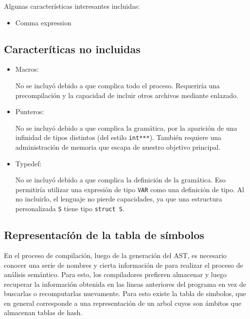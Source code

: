 \documentclass[12pt]{article}
\begin{document}
Algunas caracter\'isticas interesantes incluidas:
\begin{itemize}
    \item Comma expression
\end{itemize}

\subsection*{Caracter\'iticas no incluidas}
\begin{itemize}
    \item Macros:

    No se incluy\'o debido a que complica todo el proceso. Requerir\'ia una precompilaci\'on y la capacidad de incluir otros archivos mediante enlazado.
    \item Punteros:

    No se incluy\'o debido a que complica la gram\'atica, por la aparici\'on de una infinidad de tipos distintos (del estilo \texttt{int***}). Tambi\'en requiere una administraci\'on de memoria que escapa de nuestro objetivo principal.

    \item Typedef:

    No se incluy\'o debido a que complica la definici\'on de la gram\'atica. Eso permitir\'ia utilizar una expresi\'on de tipo \texttt{VAR} como una definici\'on de tipo. Al no incluirlo, el lenguaje no pierde capacidades, ya que una estructura personalizada \texttt{S} tiene tipo \texttt{struct S}.
\end{itemize}


\subsection*{Representací\'on de la tabla de s\'imbolos}
En el proceso de compilaci\'on, luego de la generaci\'on del AST, es necesario conocer una serie de nombres y cierta informaci\'on de para realizar el proceso de an\'alisis sem\'antico. Para esto, los compiladores prefieren almacenar y luego recuperar la informaci\'on obtenida en las lineas anteriores del programa en vez de buscarlas o recomputarlas nuevamente. Para esto existe la tabla de simbolos, que en general corresponde a una representaci\'on de un arbol cuyos son \'ambitos que almacenan tablas de hash.
\end{document}
